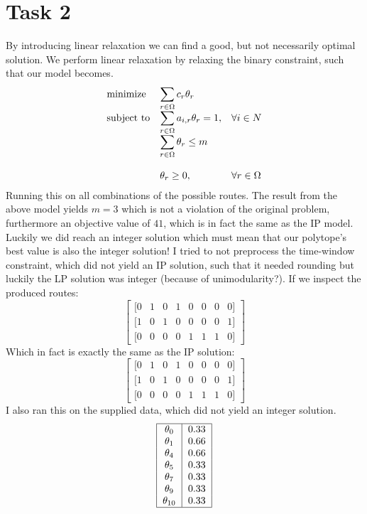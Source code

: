 \documentclass{article}
\begin{document}
    \section*{Task 2}
    By introducing linear relaxation we can find a good, but not necessarily optimal solution.
    We perform linear relaxation by relaxing the binary constraint, such that our model becomes.
    \begin{equation*}
        \begin{array}{ll@{}ll}
            \text{minimize}  & \displaystyle\sum_{r \in \Omega} c_r \theta_r& &\\
            \text{subject to}& \displaystyle\sum_{r \in \Omega} a_{i, r} \theta_r = 1 ,&   &\forall i \in N\\
            & \displaystyle\sum_{r \in \Omega} \theta_r \leq m &&\\\\
            & \displaystyle \theta_r  \geq 0,  && \forall r \in \Omega
        \end{array}
    \end{equation*}
    Running this on all combinations of the possible routes.
    The result from the above model yields $m = 3$ which is not a violation of the original problem, furthermore an objective value of $41$, which is in fact the same as the IP model.
    Luckily we did reach an integer solution which must mean that our polytope's best value is also the integer solution!
    I tried to not preprocess the time-window constraint, which did not yield an IP solution, such that it needed rounding but luckily the LP solution was integer (because of unimodularity?).
    If we inspect the produced routes:
    \[
    \begin{bmatrix}
        [0 & 1 & 0 & 1 & 0 & 0 & 0 & 0]\\
        [1 & 0 & 1 & 0 & 0 & 0 & 0 & 1]\\
        [0 & 0 & 0 & 0 & 1 & 1 & 1 & 0]
    \end{bmatrix}
    \]
    Which in fact is exactly the same as the IP solution:
    \[
        \begin{bmatrix}
            [0 & 1 & 0 & 1 & 0 & 0 & 0 & 0]\\
            [1 & 0 & 1 & 0 & 0 & 0 & 0 & 1]\\
            [0 & 0 & 0 & 0 & 1 & 1 & 1 & 0]
        \end{bmatrix}
    \]
    I also ran this on the supplied data, which did not yield an integer solution.
    \[
        \begin{tabular}{ |c|c| }
            \hline
            $\theta_{0}$ & 0.33 \\
            $\theta_{1}$ & 0.66 \\
            $\theta_{4}$ & 0.66 \\
            $\theta_{5}$ & 0.33 \\
            $\theta_{7}$ & 0.33 \\
            $\theta_{9}$ & 0.33 \\
            $\theta_{10}$ & 0.33 \\
            \hline
        \end{tabular}
    \]
\end{document}
